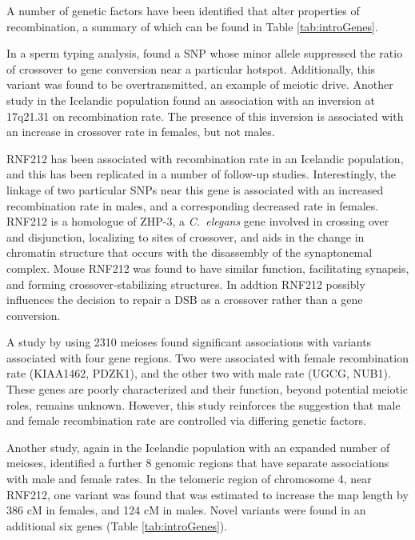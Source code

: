A number of genetic factors have been identified that alter properties of recombination, a summary of which can be found in Table \ref{tab:introGenes}.

In a sperm typing analysis, \citet{Jeffreys2005} found a SNP whose minor allele suppressed the ratio of crossover to gene conversion near a particular hotspot.
Additionally, this variant was found to be overtransmitted, an example of meiotic drive.
Another study in the Icelandic population found an association with an inversion at 17q21.31 on recombination rate\cite{Stefansson2005}.
The presence of this inversion is associated with an increase in crossover rate in females, but not males.

RNF212 has been associated with recombination rate in an Icelandic population\cite{Kong2008}, and this has been replicated in a number of follow-up studies\cite{Chowdhury2009,Fledel-Alon2011,Reynolds2013,Kong2014}.
Interestingly, the linkage of two particular SNPs near this gene is associated with an increased recombination rate in males, and a corresponding decreased rate in females.
RNF212 is a homologue of ZHP-3, a \textit{C.\ elegans} gene involved in crossing over and disjunction, localizing to sites of crossover, and aids in the change in chromatin structure that occurs with the disassembly of the synaptonemal complex\cite{Bhalla2008}.
Mouse RNF212 was found to have similar function, facilitating synapsis, and forming crossover-stabilizing structures\cite{Reynolds2013}.
In addtion RNF212 possibly influences the decision to repair a DSB as a crossover rather than a gene conversion\cite{Reynolds2013}.

A study by \citet{Chowdhury2009} using 2310 meioses found significant associations with variants associated with four gene regions.
Two were associated with female recombination rate (KIAA1462, PDZK1), and the other two with male rate (UGCG, NUB1).
These genes are poorly characterized and their function, beyond potential meiotic roles, remains unknown.
However, this study reinforces the suggestion that male and female recombination rate are controlled via differing genetic factors.

Another study, again in the Icelandic population with an expanded number of meioses, identified a further 8 genomic regions that have separate associations with male and female rates\cite{Kong2014}.
In the telomeric region of chromosome 4, near RNF212, one variant was found that was estimated to increase the map length by 386 cM in females, and 124 cM in males.
Novel variants were found in an additional six genes (Table \ref{tab:introGenes}).

